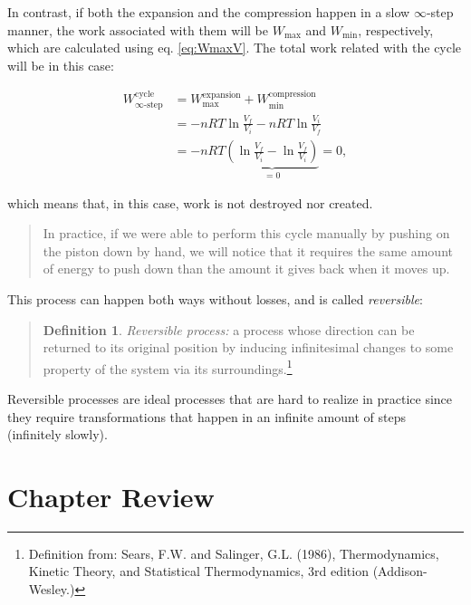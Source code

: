 \documentclass[
  9pt,
]{extbook}
\theoremstyle{definition}
\newtheorem{definition}{Definition}[chapter]
\theoremstyle{definition}
\theoremstyle{definition}
\theoremstyle{definition}
\theoremstyle{remark}
\begin{document}
In contrast, if both the expansion and the compression happen in a slow \(\infty\)-step manner, the work associated with them will be \(W_{\text{max}}\) and \(W_{\text{min}}\), respectively, which are calculated using eq. \eqref{eq:WmaxV}. The total work related with the cycle will be in this case:

\begin{equation}
\begin{aligned}
W^{\text{cycle}}_{\infty\text{-step}} {} & = W^{\text{expansion}}_{\text{max}}+W^{\text{compression}}_{\text{min}} \\
 & = -nRT \ln \frac{V_f}{V_i}-nRT \ln \frac{V_i}{V_f} \\
 & = -nRT \underbrace{\left( \ln \frac{V_f}{V_i} - \ln \frac{V_f}{V_i} \right) }_{=0}  = 0,
\end{aligned}
  \label{eq:Wtot2}
\end{equation}

which means that, in this case, work is not destroyed nor created.

\begin{quote}
In practice, if we were able to perform this cycle manually by pushing on the piston down by hand, we will notice that it requires the same amount of energy to push down than the amount it gives back when it moves up.
\end{quote}

This process can happen both ways without losses, and is called \emph{reversible}:

\begin{quote}
\begin{definition}
\protect\hypertarget{def:reversible}{}\label{def:reversible}\emph{Reversible process:} a process whose direction can be returned to its original position by inducing infinitesimal changes to some property of the system via its surroundings.\footnote{Definition from: Sears, F.W. and Salinger, G.L. (1986), Thermodynamics, Kinetic Theory, and Statistical Thermodynamics, 3rd edition (Addison-Wesley.)}
\end{definition}
\end{quote}

Reversible processes are ideal processes that are hard to realize in practice since they require transformations that happen in an infinite amount of steps (infinitely slowly).

\section{Chapter Review}\label{rev3}
\end{document}
